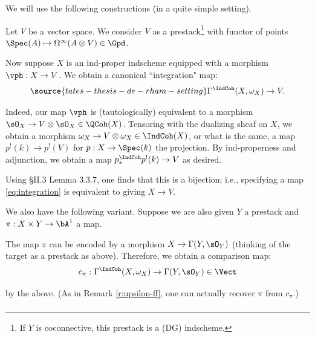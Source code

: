 \subsubsection{}\label{ss:pairing-map}

We will use the following constructions (in a quite simple setting).

Let $V$ be a vector space. We consider $V$ as a prestack\footnote{If $Y$ is
coconnective, this prestack is a (DG) indscheme.}
with functor of points $\Spec(A) \mapsto \Omega^{\infty}(A\otimes V) \in \Gpd$.

Now suppose $X$ is an ind-proper indscheme equipped with a morphism
$\vph:X \to V$. We obtain a canonical ``integration" map:
%
\begin{equation}\label{eq:integration}
\source{tates-thesis-de-rham-setting}
\Gamma^{\IndCoh}(X,\omega_X) \to V.
\end{equation}

 Indeed, our map $\vph$ is (tautologically) equivalent to
a morphism $\sO_X \to V\otimes \sO_X \in \QCoh(X)$. Tensoring with the dualizing
sheaf on $X$, we obtain a morphism $\omega_X \to V \otimes \omega_X \in \IndCoh(X)$,
or what is the same, a map $p^!(k) \to p^!(V)$ for $p:X \to \Spec(k)$ the projection.
By ind-properness and adjunction,
we obtain a map $p_*^{\IndCoh}p^!(k) \to V$ as desired.

\begin{rem}
\notready\label{r:upsilon-ff}

Using \cite{grbook} \S II.3 Lemma 3.3.7, one finds that this is a bijection;
i.e., specifying a map \eqref{eq:integration} is equivalent to giving
$X \to V$.

\end{rem}

We also have the following variant.
Suppose we are also given $Y$ a prestack and
$\pi:X \times Y \to \bA^1$ a map.

The map $\pi$ can be encoded by a morphism $X \to \Gamma(Y,\sO_Y)$ (thinking of the target
as a prestack as above). Therefore,
we obtain a comparison map:
%
\[
c_{\pi}:\Gamma^{\IndCoh}(X,\omega_X) \to \Gamma(Y,\sO_Y) \in
\Vect
\]

 by the above. (As in Remark \ref{r:upsilon-ff},
one can actually recover $\pi$ from $c_{\pi}$.)

\subsubsection{}

